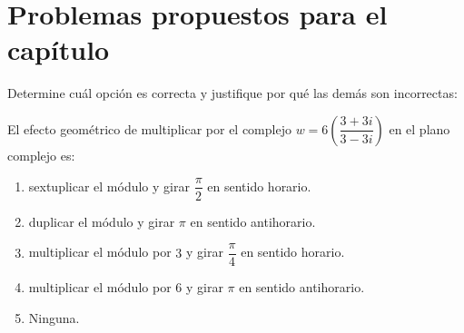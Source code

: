 \section{Problemas propuestos para el capítulo}

\begin{prob} Determine cuál opción es correcta y justifique por qué las demás son incorrectas:

El efecto geométrico de multiplicar por el complejo $w=6\left(\dfrac{3+3i}{3-3i}\right)$ en el plano complejo es:
\begin{enumerate}[$(a)$]
\item sextuplicar el módulo y girar $\dfrac{\pi}{2}$ en sentido horario.
\item duplicar el módulo y girar $\pi$ en sentido antihorario.
\item multiplicar el módulo por $3$ y girar $\dfrac{\pi}{4}$ en sentido horario.
\item multiplicar el módulo por $6$ y girar $\pi$ en sentido antihorario.
\item Ninguna.					
\end{enumerate}
\end{prob}



